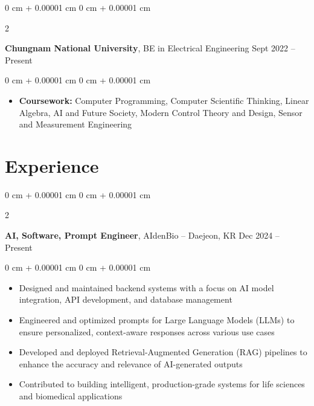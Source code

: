 \documentclass[10pt, letterpaper]{article}
\newenvironment{highlights}{
    \begin{itemize}[
        topsep=0.10 cm,
        parsep=0.10 cm,
        partopsep=0pt,
        itemsep=0pt,
        leftmargin=0 cm + 10pt
    ]
}{
    \end{itemize}
} %
\newenvironment{onecolentry}{
    \begin{adjustwidth}{
        0 cm + 0.00001 cm
    }{
        0 cm + 0.00001 cm
    }
}{
    \end{adjustwidth}
} %
\newenvironment{twocolentry}[2][]{
    \onecolentry
    \def\secondColumn{#2}
    \setcolumnwidth{\fill, 4.5 cm}
    \begin{paracol}{2}
}{
    \switchcolumn \raggedleft \secondColumn
    \end{paracol}
    \endonecolentry
} %
\begin{document}
        \begin{twocolentry}{
            Sept 2022 – Present
        }
            \textbf{Chungnam National University}, BE in Electrical Engineering\end{twocolentry}

        \vspace{0.10 cm}
        \begin{onecolentry}
            \begin{highlights}
                \item \textbf{Coursework:} Computer Programming, Computer Scientific Thinking, Linear Algebra, AI and Future Society, Modern Control Theory and Design, Sensor and Measurement Engineering

            \end{highlights}
        \end{onecolentry}
   
    \section{Experience}
        
        \begin{twocolentry}{
            Dec 2024 – Present
        }
            \textbf{ AI, Software, Prompt Engineer}, AIdenBio -- Daejeon, KR\end{twocolentry}

        \vspace{0.10 cm}
        \begin{onecolentry}
            \begin{highlights}
                \item Designed and maintained backend systems with a focus on AI model integration, API development, and database management
                \item Engineered and optimized prompts for Large Language Models (LLMs) to ensure personalized, context-aware responses across various use cases
                \item Developed and deployed Retrieval-Augmented Generation (RAG) pipelines to enhance the accuracy and relevance of AI-generated outputs
                \item Contributed to building intelligent, production-grade systems for life sciences and biomedical applications
            \end{highlights}
        \end{onecolentry}
    
\end{document}
